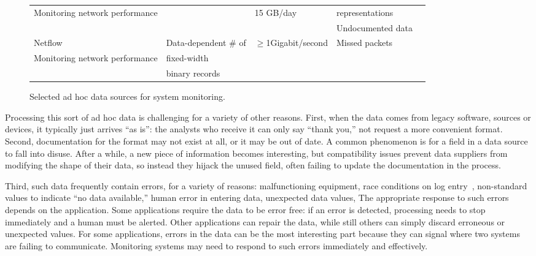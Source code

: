 \begin{figure*}
\begin{center}
\begin{tabular}{|l|l|l|l|l|}
Monitoring network performance  &        & \appr{}15 GB/day              & representations  \\ 
                                &        &                               & Undocumented data \\\hline
Netflow       & Data-dependent \# of     & $\ge$1Gigabit/second  & Missed packets\\ 
Monitoring network performance              &  fixed-width    &                       & \\ 
               & binary records & & \\ \hline
\end{tabular}
\caption{Selected ad hoc data sources for system monitoring. }
\label{figure:data-sources}
\end{center}
\end{figure*}

Processing this sort of 
ad hoc data is challenging for a variety of other reasons. 
First, when the data comes from legacy software, sources or devices, it 
typically just arrives ``as is'': the analysts
who receive it can only say ``thank you,'' not request a more
convenient format.  Second, documentation for the format may not exist
at all, or it may be out of date.  A common phenomenon is for a field
in a data source to fall into disuse.  After a while, a new piece of
information becomes interesting, but compatibility issues prevent data
suppliers from modifying the shape of their data, so instead they
hijack the unused field, often failing to update the documentation in
the process.

Third, such data frequently contain errors, for a variety of reasons:
malfunctioning equipment, race conditions on log entry~\cite{wpp},
non-standard values to indicate ``no data available,'' human error in
entering data, unexpected data values, \etc{} The appropriate response
to such errors depends on the application.  Some applications require
the data to be error free: if an error is detected, processing needs
to stop immediately and a human must be alerted.  Other applications
can repair the data, while still others can simply discard erroneous
or unexpected values.  For some applications, errors in the data can
be the most interesting part because they can signal where two systems
are failing to communicate.  Monitoring systems may need to respond to such
errors immediately and effectively.

